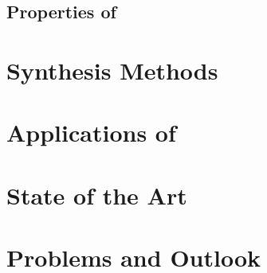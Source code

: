 \documentclass[%
 reprint,
 amsmath,amssymb,
 aps,
pra,
]{revtex4-1}
\begin{document}
\subsection{\label{subsec:mos2_properties} Properties of }

\section{\label{sec:synthesis_methods} Synthesis Methods}

\section{\label{sec:mos2_applications} Applications of }

\section{\label{sec:state_of_the_art} State of the Art}

\section{\label{sec:problems_and_outlook} Problems and Outlook}




\end{document}
